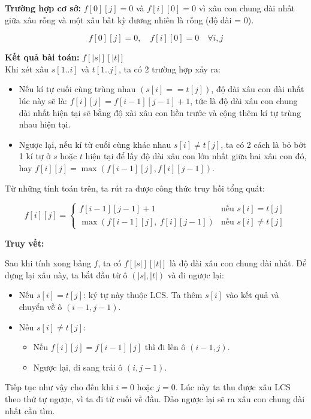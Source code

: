 \textbf{Trường hợp cơ sở:} \(f[0][j] = 0\) và \(f[i][0] = 0\) vì xâu con chung dài nhất giữa xâu rỗng và một xâu bất kỳ đương nhiên là rỗng (độ dài = 0).

\[
f[0][j] = 0, \quad f[i][0] = 0 \quad \forall i,j
\]

\textbf{Kết quả bài toán:} $f[|s|][|t|]$\\

Khi xét xâu $s[1..i]$ và $t[1..j]$, ta có 2 trường hợp xảy ra:
\begin{itemize}
    \item Nếu kí tự cuối cùng trùng nhau $(s[i] == t[j])$, độ dài xâu con dài nhất lúc này sẽ là: $f[i][j] = f[i - 1][j - 1] + 1$, tức là độ dài xâu con chung dài nhất hiện tại sẽ bằng độ xài xâu con liền trước và cộng thêm kí tự trùng nhau hiện tại.
    \item Ngược lại, nếu kí từ cuối cùng khác nhau $s[i] \neq t[j]$, ta có 2 cách là bỏ bớt 1 kí tự ở $s$ hoặc $t$ hiện tại để lấy độ dài xâu con lớn nhất giữa hai xâu con đó, hay $f[i][j] = \max (f[i - 1][j], f[i][j - 1])$.
\end{itemize}

Từ những tính toán trên, ta rút ra được công thức truy hồi tổng quát:

\[
f[i][j] =
\begin{cases}
    f[i - 1][j - 1] + 1 & \text{nếu } s[i] = t[j] \\
    \max(f[i - 1][j],\ f[i][j - 1]) & \text{nếu } s[i] \neq t[j]
\end{cases}
\]

\textbf{Truy vết:}

Sau khi tính xong bảng $f$, ta có $f[|s|][|t|]$ là độ dài xâu con chung dài nhất.  
Để dựng lại xâu này, ta bắt đầu từ ô $(|s|, |t|)$ và đi ngược lại:

\begin{itemize}
    \item Nếu $s[i] = t[j]$: ký tự này thuộc LCS.  
    Ta thêm $s[i]$ vào kết quả và chuyển về ô $(i-1, j-1)$.
    \item Nếu $s[i] \neq t[j]$:  
    \begin{itemize}
        \item Nếu $f[i][j] = f[i-1][j]$ thì đi lên ô $(i-1, j)$.
        \item Ngược lại, đi sang trái ô $(i, j-1)$.
    \end{itemize}
\end{itemize}

Tiếp tục như vậy cho đến khi $i=0$ hoặc $j=0$.  
Lúc này ta thu được xâu LCS theo thứ tự ngược, vì ta đi từ cuối về đầu.  
Đảo ngược lại sẽ ra xâu con chung dài nhất cần tìm.\\



